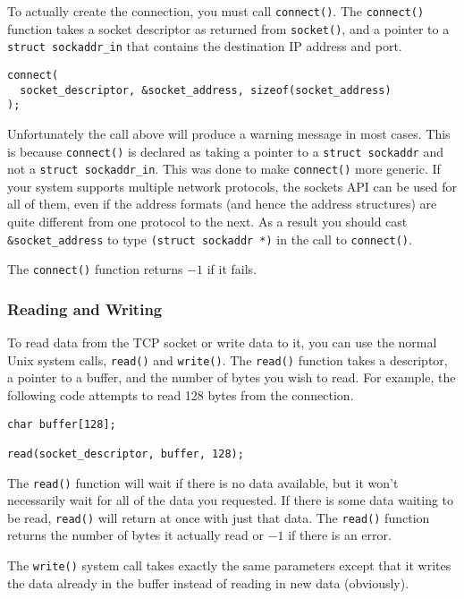 \documentclass{article}
\begin{document}
To actually create the connection, you must call \texttt{connect()}. The \texttt{connect()} function takes a socket descriptor as returned from \texttt{socket()}, and a pointer to a \texttt{struct sockaddr\_in} that contains the destination IP address and port.

\begin{verbatim}
connect(
  socket_descriptor, &socket_address, sizeof(socket_address)
);
\end{verbatim}

Unfortunately the call above will produce a warning message in most cases. This is because \texttt{connect()} is declared as taking a pointer to a \texttt{struct sockaddr} and not a \texttt{struct sockaddr\_in}. This was done to make \texttt{connect()} more generic. If your system supports multiple network protocols, the sockets API can be used for all of them, even if the address formats (and hence the address structures) are quite different from one protocol to the next. As a result you should cast \texttt{\&socket\_address} to type \texttt{(struct sockaddr *)} in the call to \texttt{connect()}.

The \texttt{connect()} function returns $-1$ if it fails.

\subsubsection{Reading and Writing}

To read data from the TCP socket or write data to it, you can use the normal Unix system calls, \texttt{read()} and \texttt{write()}. The \texttt{read()} function takes a descriptor, a pointer to a buffer, and the number of bytes you wish to read. For example, the following code attempts to read 128 bytes from the connection.

\begin{verbatim}
char buffer[128];

read(socket_descriptor, buffer, 128);
\end{verbatim}

The \texttt{read()} function will wait if there is no data available, but it won't necessarily wait for all of the data you requested. If there is some data waiting to be read, \texttt{read()} will return at once with just that data. The \texttt{read()} function returns the number of bytes it actually read or $-1$ if there is an error.

The \texttt{write()} system call takes exactly the same parameters except that it writes the data already in the buffer instead of reading in new data (obviously).
\end{document}
